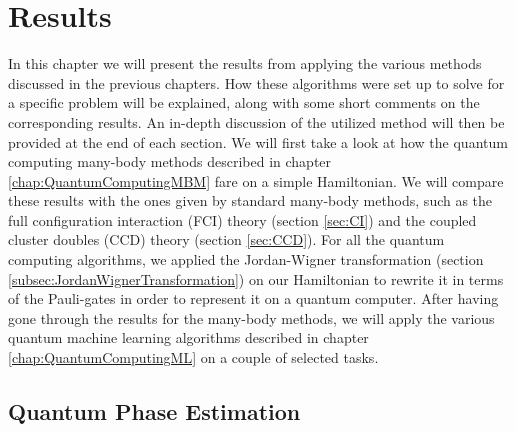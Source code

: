 \chapter{Results}
\label{chap:Results}
In this chapter we will present the results from applying the various methods discussed in the previous chapters. How these algorithms were set up to solve for a specific problem will be explained, along with some short comments on the corresponding results. An in-depth discussion of the utilized method will then be provided at the end of each section.\newline
We will first take a look at how the quantum computing many-body methods described in chapter \ref{chap:QuantumComputingMBM} fare on a simple Hamiltonian. We will compare these results with the ones given by standard many-body methods, such as the full configuration interaction (FCI) theory (section \ref{sec:CI}) and the coupled cluster doubles (CCD) theory (section \ref{sec:CCD}). For all the quantum computing algorithms, we applied the Jordan-Wigner transformation (section \ref{subsec:JordanWignerTransformation}) on our Hamiltonian to rewrite it in terms of the Pauli-gates in order to represent it on a quantum computer.\newline 
After having gone through the results for the many-body methods, we will apply the various quantum machine learning algorithms described in chapter \ref{chap:QuantumComputingML} on a couple of selected tasks.


\section{Quantum Phase Estimation}
\label{sec:ResultsQPE}

